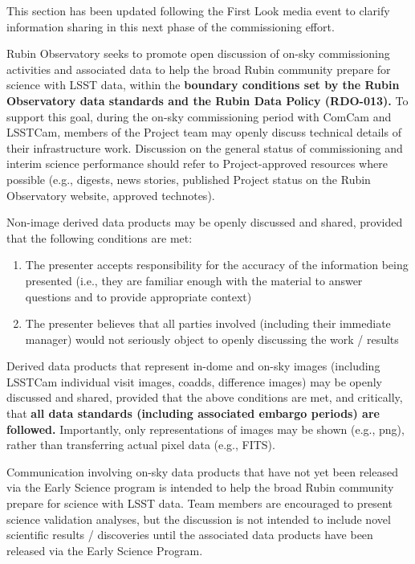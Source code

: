 \documentclass[SE,authoryear,toc]{lsstdoc}
\begin{document}
\begin{note}
This section has been updated following the First Look media event to clarify information sharing in this next phase of the commissioning effort.
\end{note}

Rubin Observatory seeks to promote open discussion of on-sky commissioning activities and associated data to help the broad Rubin community prepare for science with LSST data, within the \textbf{boundary conditions set by the Rubin Observatory data standards and the Rubin Data Policy (RDO-013).}
To support this goal, during the on-sky commissioning period with ComCam and LSSTCam, members of the Project team may openly discuss technical details of their infrastructure work.
Discussion on the general status of commissioning and interim science performance should refer to Project-approved resources where possible (e.g., digests, news stories, published Project status on the Rubin Observatory website, approved technotes).


Non-image derived data products may be openly discussed and shared, provided that the following conditions are met:

\begin{enumerate}

\item The presenter accepts responsibility for the accuracy of the information being presented (i.e., they are familiar enough with the material to answer questions and to provide appropriate context)

\item The presenter believes that all parties involved (including their immediate manager) would not seriously object to openly discussing the work / results

\end{enumerate}

Derived data products that represent in-dome and on-sky images (including LSSTCam individual visit images, coadds, difference images) may be openly discussed and shared, provided that the above conditions are met, and critically, that \textbf{all data standards (including associated embargo periods) are followed.}
Importantly, only representations of images may be shown (e.g., png), rather than transferring actual pixel data (e.g., FITS).

Communication involving on-sky data products that have not yet been released via the Early Science program is intended to help the broad Rubin community prepare for science with LSST data.
Team members are encouraged to present science validation analyses, but the discussion is not intended to include novel scientific results / discoveries until the associated data products have been released via the Early Science Program.
\end{document}
